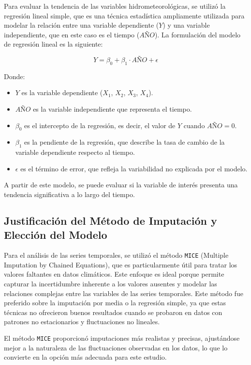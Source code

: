 Para evaluar la tendencia de las variables hidrometeorológicas, se utilizó la regresión lineal simple, que es una técnica estadística ampliamente utilizada para modelar la relación entre una variable dependiente (\( Y \)) y una variable independiente, que en este caso es el tiempo (\( AÑO \)). La formulación del modelo de regresión lineal es la siguiente:

\[
Y = \beta_0 + \beta_1 \cdot AÑO + \epsilon
\]

Donde:
\begin{itemize}
    \item \( Y \) es la variable dependiente (\( X_1 \), \( X_2 \), \( X_3 \), \( X_4 \)).
    \item \( AÑO \) es la variable independiente que representa el tiempo.
    \item \( \beta_0 \) es el intercepto de la regresión, es decir, el valor de \( Y \) cuando \( AÑO = 0 \).
    \item \( \beta_1 \) es la pendiente de la regresión, que describe la tasa de cambio de la variable dependiente respecto al tiempo.
    \item \( \epsilon \) es el término de error, que refleja la variabilidad no explicada por el modelo.
\end{itemize}

A partir de este modelo, se puede evaluar si la variable de interés presenta una tendencia significativa a lo largo del tiempo.

\subsection{Justificación del Método de Imputación y Elección del Modelo}

Para el análisis de las series temporales, se utilizó el método \texttt{MICE} (Multiple Imputation by Chained Equations), que es particularmente útil para tratar los valores faltantes en datos climáticos. Este enfoque es ideal porque permite capturar la incertidumbre inherente a los valores ausentes y modelar las relaciones complejas entre las variables de las series temporales. Este método fue preferido sobre la imputación por media o la regresión simple, ya que estas técnicas no ofrecieron buenos resultados cuando se probaron en datos con patrones no estacionarios y fluctuaciones no lineales.

El método \texttt{MICE} proporcionó imputaciones más realistas y precisas, ajustándose mejor a la naturaleza de las fluctuaciones observadas en los datos, lo que lo convierte en la opción más adecuada para este estudio.

